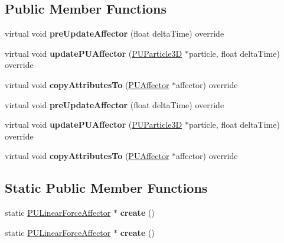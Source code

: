 \subsection*{Public Member Functions}
\begin{DoxyCompactItemize}
\item 
\mbox{\label{classPULinearForceAffector_a4de387b580bd0ddb4e125cbc8e74a51f}} 
virtual void {\bfseries pre\+Update\+Affector} (float delta\+Time) override
\item 
\mbox{\label{classPULinearForceAffector_adc8498f41dc80f8020e11353ad38afda}} 
virtual void {\bfseries update\+P\+U\+Affector} (\hyperlink{structPUParticle3D}{P\+U\+Particle3D} $\ast$particle, float delta\+Time) override
\item 
\mbox{\label{classPULinearForceAffector_ae54d4760fd7ce18250ca3cbf00cb3b83}} 
virtual void {\bfseries copy\+Attributes\+To} (\hyperlink{classPUAffector}{P\+U\+Affector} $\ast$affector) override
\item 
\mbox{\label{classPULinearForceAffector_ab09ec0bd15c00c9780217595963c6312}} 
virtual void {\bfseries pre\+Update\+Affector} (float delta\+Time) override
\item 
\mbox{\label{classPULinearForceAffector_a168b12d1ba92c447d9d9a7f29f23c0fb}} 
virtual void {\bfseries update\+P\+U\+Affector} (\hyperlink{structPUParticle3D}{P\+U\+Particle3D} $\ast$particle, float delta\+Time) override
\item 
\mbox{\label{classPULinearForceAffector_af6e0246c7a7d65242b5578461836422d}} 
virtual void {\bfseries copy\+Attributes\+To} (\hyperlink{classPUAffector}{P\+U\+Affector} $\ast$affector) override
\end{DoxyCompactItemize}
\subsection*{Static Public Member Functions}
\begin{DoxyCompactItemize}
\item 
\mbox{\label{classPULinearForceAffector_a36b909ed639fe15f458b1eafe2b7fb63}} 
static \hyperlink{classPULinearForceAffector}{P\+U\+Linear\+Force\+Affector} $\ast$ {\bfseries create} ()
\item 
\mbox{\label{classPULinearForceAffector_a0cf2b9fac8c68ed0191f89f1960e26e0}} 
static \hyperlink{classPULinearForceAffector}{P\+U\+Linear\+Force\+Affector} $\ast$ {\bfseries create} ()
\end{DoxyCompactItemize}
